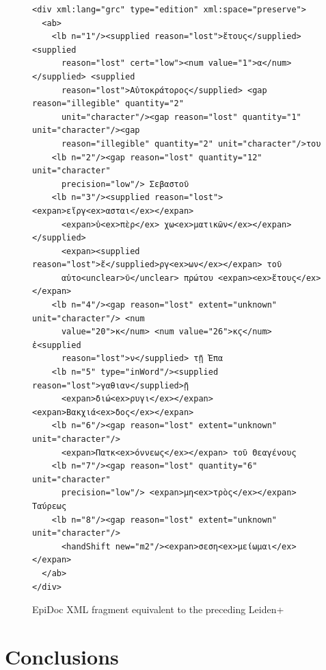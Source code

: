 \documentclass[]{article}
\begin{document}
\begin{figure}[hb]
  \begin{verbatim}
<div xml:lang="grc" type="edition" xml:space="preserve">
  <ab>
    <lb n="1"/><supplied reason="lost">ἔτους</supplied> <supplied
      reason="lost" cert="low"><num value="1">α</num> </supplied> <supplied
      reason="lost">Αὐτοκράτορος</supplied> <gap reason="illegible" quantity="2"
      unit="character"/><gap reason="lost" quantity="1" unit="character"/><gap
      reason="illegible" quantity="2" unit="character"/>του
    <lb n="2"/><gap reason="lost" quantity="12" unit="character"
      precision="low"/> Σεβαστοῦ
    <lb n="3"/><supplied reason="lost"><expan>εἴργ<ex>ασται</ex></expan>
      <expan>ὑ<ex>πὲρ</ex> χω<ex>ματικῶν</ex></expan></supplied>
      <expan><supplied reason="lost">ἔ</supplied>ργ<ex>ων</ex></expan> τοῦ
      αὐτο<unclear>ῦ</unclear> πρώτου <expan><ex>ἔτους</ex></expan>
    <lb n="4"/><gap reason="lost" extent="unknown" unit="character"/> <num
      value="20">κ</num> <num value="26">κϛ</num> ἐ<supplied
      reason="lost">ν</supplied> τῇ Ἐπα
    <lb n="5" type="inWord"/><supplied reason="lost">γαθιαν</supplied>ῇ
      <expan>διώ<ex>ρυγι</ex></expan> <expan>Βακχιά<ex>δος</ex></expan>
    <lb n="6"/><gap reason="lost" extent="unknown" unit="character"/>
      <expan>Πατκ<ex>όννεως</ex></expan> τοῦ Θεαγένους
    <lb n="7"/><gap reason="lost" quantity="6" unit="character"
      precision="low"/> <expan>μη<ex>τρὸς</ex></expan> Ταύρεως
    <lb n="8"/><gap reason="lost" extent="unknown" unit="character"/>
      <handShift new="m2"/><expan>σεση<ex>μείωμαι</ex></expan>
  </ab>
</div>
  \end{verbatim}
  \caption{EpiDoc XML fragment equivalent to the preceding Leiden+\label{epidoc}}
\end{figure}




\section*{Conclusions}



\end{document}
